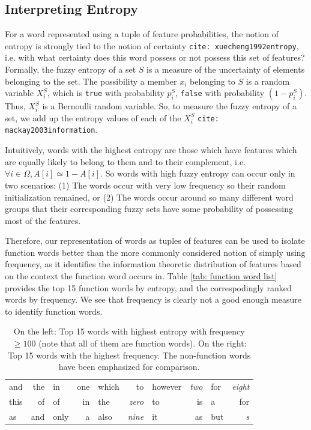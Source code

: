 \documentclass{book}
\newcommand{\citep}[1]{\texttt{cite: #1}}
\begin{document}
\subsection{Interpreting Entropy} \label{ssec: entropy math} For a word
represented using a tuple of feature probabilities, the notion of entropy is
strongly tied to the notion of certainty \citep{xuecheng1992entropy}, i.e. with
what certainty does this word possess or not possess this set of features?
Formally, the fuzzy entropy of a set $S$ is a measure of the uncertainty of
elements belonging to the set. The possibility a member $x_i$ belonging to $S$
is a random variable $X^S_i$, which is \texttt{true} with probability $p^S_i$,
\texttt{false} with probability $(1 - p^S_i)$. Thus, $X^S_i$ is a Bernoulli
random variable. So, to measure the fuzzy entropy of a set, we add up the
entropy values of each of the $X^S_i$ \citep{mackay2003information}. 

Intuitively, words with the highest entropy are those which have features which
are equally likely to belong to them and to their complement, i.e. $\forall i
\in \Omega, A[i] \simeq 1 - A[i]$. So words with high fuzzy entropy can occur
only in two scenarios: (1) The words occur with very low frequency so their
random initialization remained, or (2) The words occur around so many different
word groups that their corresponding fuzzy sets have some probability of
possessing most of the features.

Therefore, our representation of words as tuples of features can be used to
isolate function words better than the more commonly considered notion of
simply using frequency, as it identifies the information theoretic distribution
of features based on the context the function word occurs in. Table \ref{tab:
function word list} provides the top 15 function words by entropy, and the
correspodingly ranked words by frequency. We see that frequency is clearly not
a good enough measure to identify function words. 

{\tiny
\begin{table}[t]
    \centering
    {\small
    \begin{tabular}{l r | l r | l r | l r | l r}
    and		& the   &   in		&   one         &   which	    &   to          &   however	&   \emph{two}  &   for	    &   \emph{eight}  \\
    this    & of    &   of	    &   in          &   the		    &   \emph{zero} &   to		&   is          &   a	    &   for \\
    as	    & and   &   only	&   a           &   also	    &   \emph{nine} &   it		&   as          &   but	    &   \emph{s} 
    \end{tabular}
    }
    \caption{On the left: Top 15 words with highest entropy with frequency $\geq 100$ (note that all of them are function words). On the right: Top 15 words with the highest frequency. The non-function words have been emphasized for comparison.}
    \label{tab: function word list}
\end{table}
}   
\end{document}
